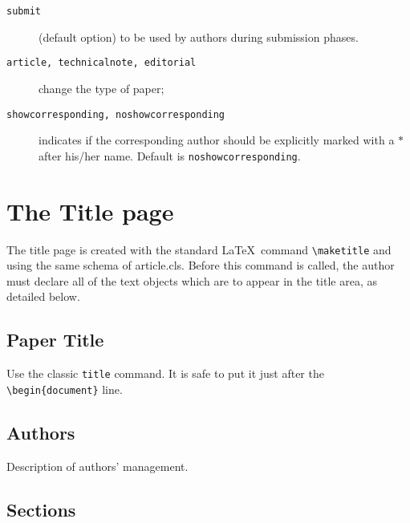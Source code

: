 \documentclass[10pt]{imeko_acta}
\begin{document}
\begin{description}

\item [{\tt submit}]  (default option) to be used by authors during submission phases.


\item [{\tt article, technicalnote, editorial}]  change the type of paper;

\item [{\tt showcorresponding, noshowcorresponding}] indicates if the corresponding author should be explicitly marked with a $\ast$ after his/her name. Default is \verb|noshowcorresponding|.

\end{description}

\section{The Title page}

The title page is created with the standard \LaTeX\ command \verb|\maketitle| and using the same schema of article.cls.
Before this command is called, the author must declare all of the text objects which are to appear in the title area, as detailed below.

\subsection{Paper Title} \label{sec:sub1}

Use the classic \verb|title| command. It is safe to put it just after the \verb|\begin{document}| line.

\subsection{Authors}

Description of authors' management.

\subsection{Sections}
\end{document}
